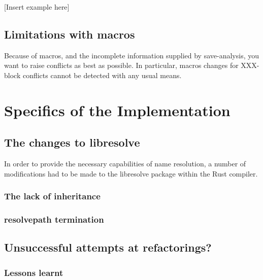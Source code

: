 [Insert example here]

\subsection{Limitations with macros}
Because of macros, and the incomplete information supplied by save-analysis, you want to raise conflicts as best as possible. In particular, macros changes for XXX-block conflicts cannot be detected with any usual means.

\section{Specifics of the Implementation}
\subsection{The changes to libresolve}
In order to provide the necessary capabilities of name resolution, a number of modifications had to be made to the libresolve package within the Rust compiler.
\subsubsection{The lack of inheritance}
\subsubsection{resolvepath termination}

\subsection{Unsuccessful attempts at refactorings?}
\subsubsection{Lessons learnt}